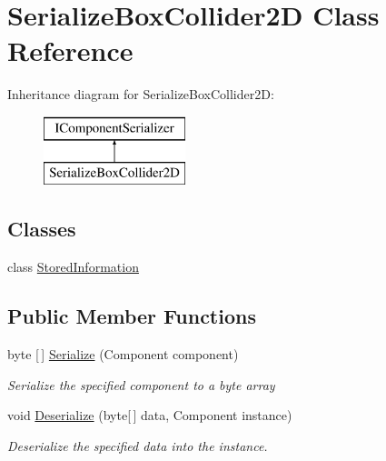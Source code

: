 \hypertarget{class_serialize_box_collider2_d}{}\section{Serialize\+Box\+Collider2D Class Reference}
\label{class_serialize_box_collider2_d}
Inheritance diagram for Serialize\+Box\+Collider2D\+:\begin{figure}[H]
\begin{center}
\leavevmode
\includegraphics[height=2.000000cm]{class_serialize_box_collider2_d}
\end{center}
\end{figure}
\subsection*{Classes}
\begin{DoxyCompactItemize}
\item 
class \hyperlink{class_serialize_box_collider2_d_1_1_stored_information}{Stored\+Information}
\end{DoxyCompactItemize}
\subsection*{Public Member Functions}
\begin{DoxyCompactItemize}
\item 
byte \mbox{[}$\,$\mbox{]} \hyperlink{class_serialize_box_collider2_d_ab002b432810dbe5029e486b8f0a85878}{Serialize} (Component component)
\begin{DoxyCompactList}\small\item\em Serialize the specified component to a byte array \end{DoxyCompactList}\item 
void \hyperlink{class_serialize_box_collider2_d_ad00de81c7e9e81bc30beb97194f34e17}{Deserialize} (byte\mbox{[}$\,$\mbox{]} data, Component instance)
\begin{DoxyCompactList}\small\item\em Deserialize the specified data into the instance. \end{DoxyCompactList}\end{DoxyCompactItemize}


